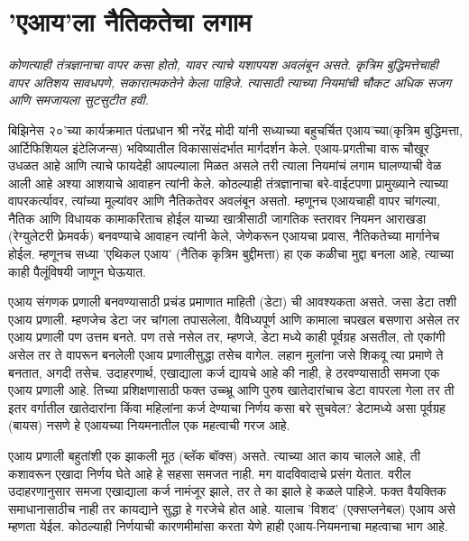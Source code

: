 \chapter{'एआय'ला नैतिकतेचा लगाम}

{\textit{कोणत्याही तंत्रज्ञानाचा वापर कसा होतो,  यावर त्याचे यशापयश अवलंबून असते.  कृत्रिम बुद्धिमत्तेचाही वापर अतिशय सावधपणे,  सकारात्मकतेने केला पाहिजे. त्यासाठी त्याच्या नियमांची चौकट अधिक सजग आणि समजायला सुटसुटीत हवी. }}

\vspace{1.5em}

बिझिनेस २०'च्या कार्यक्रमात पंतप्रधान श्री नरेंद्र मोदी यांनी सध्याच्या बहुचर्चित एआय'च्या(कृत्रिम बुद्धिमत्ता,  आर्टिफिशियल इंटेलिजन्स) भविष्यातील विकासासंदर्भात मार्गदर्शन केले. एआय-प्रगतीचा वारू चौखूर उधळत आहे आणि त्याचे फायदेही आपल्याला मिळत असले तरी त्याला नियमांचं लगाम घालण्याची वेळ आली आहे अश्या आशयाचे आवाहन त्यांनी केले. कोठल्याही तंत्रज्ञानाचा बरे-वाईटपणा प्रामुख्याने त्याच्या वापरकर्त्यावर, त्यांच्या मूल्यांवर आणि नैतिकतेवर अवलंबून असतो. म्हणूनच एआयचाही वापर चांगल्या, नैतिक आणि विधायक कामाकरिताच होईल याच्या खात्रीसाठी जागतिक स्तरावर नियमन आराखडा (रेग्युलेटरी फ्रेमवर्क) बनवण्याचे आवाहन त्यांनी केले, जेणेकरून एआयचा प्रवास, नैतिकतेच्या मार्गानेच होईल. म्हणूनच सध्या 'एथिकल एआय' (नैतिक कृत्रिम बुद्दीमत्ता) हा एक कळीचा मुद्दा बनला आहे, त्याच्या काही पैलूंविषयी जाणून घेऊयात.

एआय संगणक प्रणाली बनवण्यासाठी प्रचंड प्रमाणात माहिती (डेटा) ची आवश्यकता असते. जसा डेटा तशी एआय प्रणाली. म्हणजेच डेटा जर चांगला तपासलेला, वैविध्यपूर्ण आणि कामाला चपखल बसणारा असेल तर एआय प्रणाली पण उत्तम बनते. पण तसे नसेल तर, म्हणजे, डेटा मध्ये काही पूर्वग्रह असतील, तो एकांगी असेल तर ते वापरून बनलेली एआय प्रणालीसुद्धा तसेच वागेल. लहान मुलांना जसे शिकवू त्या प्रमाणे ते बनतात, अगदी तसेच. उदाहरणार्थ, एखाद्याला कर्ज द्यायचे आहे की नाही, हे ठरवण्यासाठी समजा एक एआय प्रणाली आहे. तिच्या प्रशिक्षणासाठी फक्त उच्च्भ्रू आणि पुरुष खातेदारांचाच डेटा वापरला गेला तर ती इतर वर्गातील खातेदारांना किंवा महिलांना कर्ज देण्याचा निर्णय कसा बरे सुचवेल? डेटामध्ये असा पूर्वग्रह (बायस) नसणे हे एआयच्या नियमनातील एक महत्वाची गरज आहे.

एआय प्रणाली बहुतांशी एक झाकली मूठ (ब्लॅक बॉक्स) असते. त्याच्या आत काय चालले आहे, ती कशावरून एखादा निर्णय घेते आहे हे सहसा समजत नाही. मग वादविवादाचे प्रसंग येतात. वरील उदाहरणानुसार समजा एखाद्याला कर्ज नामंजूर झाले, तर ते का झाले हे कळले पाहिजे. फक्त वैयक्तिक समाधानासाठीच नाही तर कायद्याने सुद्धा हे गरजेचे होत आहे. यालाच 'विशद' (एक्सप्लनेबल) एआय असे म्हणता येईल. कोठल्याही निर्णयाची कारणमीमांसा करता येणे हाही एआय-नियमनाचा महत्वाचा भाग आहे.

